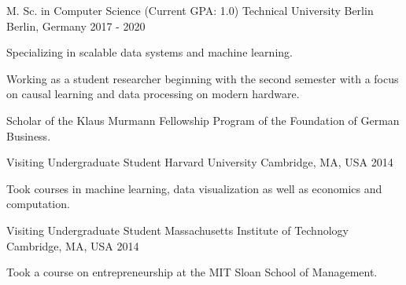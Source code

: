 

\begin{cventries}

  \cventry
    {M. Sc. in Computer Science (Current GPA: 1.0)} %
    {Technical University Berlin} %
    {Berlin, Germany} %
    {2017 - 2020} %
    {
      \begin{cvitems} %
        \item{Specializing in scalable data systems and machine learning.}
        \item{Working as a student researcher beginning with the second semester with a focus on causal learning and data processing on modern hardware.}
        \item{Scholar of the Klaus Murmann Fellowship Program of the Foundation of German Business.}
      \end{cvitems}
    }

  \cventry
    {Visiting Undergraduate Student} %
    {Harvard University} %
    {Cambridge, MA, USA} %
    {2014} %
    {
      \begin{cvitems} %
        \item{Took courses in machine learning, data visualization as well as economics and computation.}
      \end{cvitems}
    }

  \cventry
    {Visiting Undergraduate Student} %
    {Massachusetts Institute of Technology} %
    {Cambridge, MA, USA} %
    {2014} %
    {
      \begin{cvitems} %
        \item{Took a course on entrepreneurship at the MIT Sloan School of Management.}
      \end{cvitems}
    }


\end{cventries}
